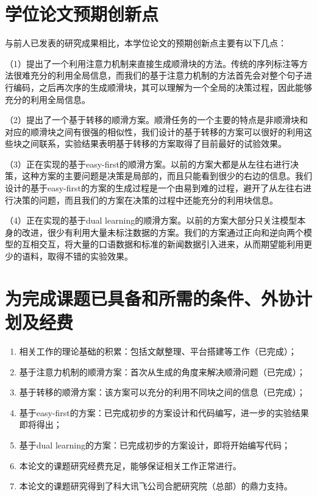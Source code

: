 \section{学位论文预期创新点}
与前人已发表的研究成果相比，本学位论文的预期创新点主要有以下几点：

（1）提出了一个利用注意力机制来直接生成顺滑块的方法。传统的序列标注等方法很难充分的利用全局信息，而我们的基于注意力机制的方法首先会对整个句子进行编码，之后再次序的生成顺滑块，其可以理解为一个全局的决策过程，因此能够充分的利用全局信息。

（2）提出了一个基于转移的顺滑方案。顺滑任务的一个主要的特点是非顺滑块和对应的顺滑块之间有很强的相似性，我们设计的基于转移的方案可以很好的利用这些块之间联系，实验结果表明基于转移的方案取得了目前最好的试验效果。

（3）正在实现的基于easy-first的顺滑方案。以前的方案大都是从左往右进行决策，这种方案的主要问题是决策是局部的，而且只能看到很少的右边的信息。我们设计的基于easy-first的方案的生成过程是一个由易到难的过程，避开了从左往右进行决策的问题，而且我们的方案在决策的过程中还能充分的利用块信息。

（4）正在实现的基于dual learning的顺滑方案。以前的方案大部分只关注模型本身的改进，很少有利用大量未标注数据的方案。我们的方案通过正向和逆向两个模型的互相交互，将大量的口语数据和标准的新闻数据引入进来，从而期望能利用更少的语料，取得不错的实验效果。


\section{为完成课题已具备和所需的条件、外协计划及经费}
\begin{enumerate}
	\item 相关工作的理论基础的积累：包括文献整理、平台搭建等工作（已完成）；
	\item 基于注意力机制的顺滑方案：首次从生成的角度来解决顺滑问题（已完成）；
	\item 基于转移的顺滑方案：该方案可以充分的利用不同块之间的信息（已完成）；
	\item 基于easy-first的方案：已完成初步的方案设计和代码编写，进一步的实验结果即将得出；
	\item 基于dual learning的方案：已完成初步的方案设计，即将开始编写代码；
	\item 本论文的课题研究经费充足，能够保证相关工作正常进行。
	\item 本论文的课题研究得到了科大讯飞公司合肥研究院（总部）的鼎力支持。
\end{enumerate}

